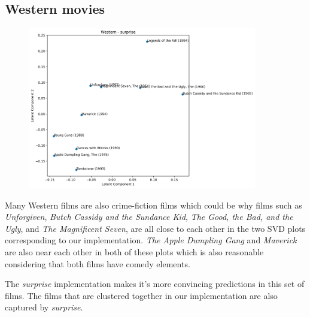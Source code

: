 \subsection{Western movies}

\begin{figure}[H]
    \centering
\end{figure}
\begin{figure}[H]
    \centering 
    \includegraphics[width=10cm]{western_SVD_sp.png}
\end{figure}

Many Western films are also crime-fiction films which could be why films such as \textit{Unforgiven}, \textit{Butch Cassidy and the Sundance 
Kid}, \textit{The Good, the Bad, and the Ugly}, and \textit{The Magnificent Seven}, are all close to each other in the two SVD plots corresponding 
to our implementation. \textit{The Apple Dumpling Gang} and \textit{Maverick} are also near each other in both of these plots which is also 
reasonable considering that both films have comedy elements.
\par 
The \textit{surprise} implementation makes it's more convincing predictions in this set of films. The films that are clustered together 
in our implementation are also captured by \textit{surprise}.


